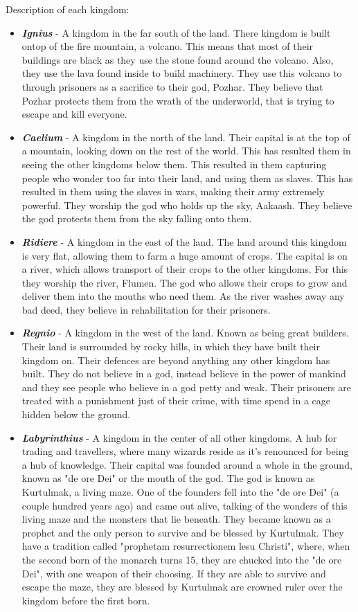 \documentclass{article}
\begin{document}
                Description of each kingdom:
                \begin{itemize}
                    \item \textbf{\emph{Ignius}} - A kingdom in the far south of the land. There kingdom is built ontop of the fire mountain, a volcano. This means that most of their buildings are black as they use the stone found around the volcano. Also, they use the lava found inside to build machinery. They use this volcano to through prisoners as a sacrifice to their god, Pozhar. They believe that Pozhar protects them from the wrath of the underworld, that is trying to escape and kill everyone.
                    \item \textbf{\emph{Caelium}} - A kingdom in the north of the land. Their capital is at the top of a mountain, looking down on the rest of the world. This has resulted them in seeing the other kingdoms below them. This resulted in them capturing people who wonder too far into their land, and using them as slaves. This has resulted in them using the slaves in wars, making their army extremely powerful. They worship the god who holds up the sky, Aakaash. They believe the god protects them from the sky falling onto them.
                    \item \textbf{\emph{Ridiere}} - A kingdom in the east of the land. The land around this kingdom is very flat, allowing them to farm a huge amount of crops. The capital is on a river, which allows transport of their crops to the other kingdoms. For this they worship the river, Flumen. The god who allows their crops to grow and deliver them into the mouths who need them. As the river washes away any bad deed, they believe in rehabilitation for their prisoners.
                    \item \textbf{\emph{Regnio}} - A kingdom in the west of the land. Known as being great builders. Their land is surrounded by rocky hills, in which they have built their kingdom on. Their defences are beyond anything any other kingdom has built. They do not believe in a god, instead believe in the power of mankind and they see people who believe in a god petty and weak. Their prisoners are treated with a punishment just of their crime, with time spend in a cage hidden below the ground.
                    \item \textbf{\emph{Labyrinthius}} - A kingdom in the center of all other kingdoms. A hub for trading and travellers, where many wizards reside as it's renounced for being a hub of knowledge. Their capital was founded around a whole in the ground, known as "de ore Dei" or the mouth of the god. The god is known as Kurtulmak, a living maze. One of the founders fell into the "de ore Dei" (a couple hundred years ago) and came out alive, talking of the wonders of this living maze and the monsters that lie beneath. They became known as a prophet and the only person to survive and be blessed by Kurtulmak. They have a tradition called "prophetam resurrectionem lesu Christi", where, when the second born of the monarch turns 15, they are chucked into the "de ore Dei", with one weapon of their choosing. If they are able to survive and escape the maze, they are blessed by Kurtulmak are crowned ruler over the kingdom before the first born.

\end{itemize}
\end{document}
